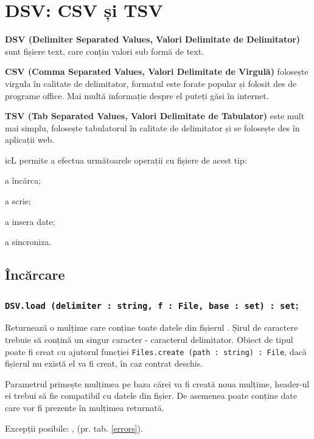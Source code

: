 \section{DSV: CSV și TSV}

{\bf DSV (Delimiter Separated Values, Valori Delimitate de Delimitator)} sunt fișiere text, care conțin valori sub formă de text.

{\bf CSV (Comma Separated Values, Valori Delimitate de Virgulă)} folosește virgula în calitate de delimitator, formatul este forate popular și folosit des de programe office. Mai multă informație despre el puteți găsi în internet.

{\bf TSV (Tab Separated Values, Valori Delimitate de Tabulator)} este mult mai simplu, folosește tabulatorul în calitate de delimitator și se folosește des în aplicații web.

icL permite a efectua următoarele operații cu fișiere de acest tip:
\begin{icItems}
	\item a încărca;
	\item a scrie;
	\item a insera date;
	\item a sincroniza.
\end{icItems}

\subsection{Încărcare}

\subsubsection{\lstinline|DSV.load (delimiter : string, f : File, base : set) : set|;}

Returnează o mulțime care conține toate datele din fișierul . Șirul de caractere  trebuie să conțină un singur caracter - caracterul delimitator. Obiect de tipul  poate fi creat cu ajutorul funcției \lstinline|Files.create (path : string) : File|, dacă fișierul nu există el va fi creat, în caz contrat deschis.

Parametrul  primește mulțimea pe baza cărei va fi creată noua mulțime, header-ul ei trebui să fie compatibil cu datele din fișier. De asemenea poate conține date care vor fi prezente în mulțimea returnată.

Excepții posibile: ,  (pr. tab. \ref{errors}).

